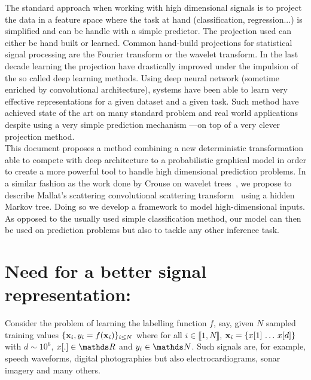 \documentclass[a4paper,11pt]{report}
\begin{document}
	The standard approach when working with high dimensional signals is to project the data in a feature space where the task at hand (classification, regression...) is simplified and can be handle with a simple predictor. The projection used can either be hand built or learned. Common hand-build projections for statistical signal processing are the Fourier transform or the wavelet transform. In the last decade learning the projection have drastically improved under the impulsion of the so called deep learning methods. Using deep neural network (sometime enriched by convolutional architecture), systems have been able to learn very effective representations for a given dataset and a given task. Such method have achieved state of the art on many standard problem and real world applications despite using a very simple prediction mechanism ---on top of a very clever projection method.\\
	
	This document proposes a method combining a new deterministic transformation able to compete with deep architecture to a probabilistic graphical model in order to create a more powerful tool to handle high dimensional prediction problems. In a similar fashion as the work done by Crouse on wavelet trees~\citep{crouse1998wavelet}, we propose to describe Mallat's scattering convolutional scattering transform~\citep{bruna2010classification} using a hidden Markov tree. Doing so we develop a framework to model high-dimensional inputs. As opposed to the usually used simple classification method, our model can then be used on prediction problems but also to tackle any  other inference task.
		   
	\section{Need for a better signal representation:}
		\label{sec:Intro/Need}
		
		Consider the problem of learning the labelling function $f$, say, given $N$ sampled training values $\{{\bf x}_{i}, y_{i}=f({\bf x}_{i})\}_{i\leq N}$ where  for all $i \in \llbracket 1 , N \rrbracket$, ${\bf x}_{i} =\{ x[1] \, \dots \, x[d] \}$ with $d \sim 10^{6}$, $x[.] \in \dsR$ and $y_{i} \in \dsN$. Such signals are, for example, speech waveforms, digital photographies but also electrocardiograms, sonar imagery and many others.  
\end{document}
